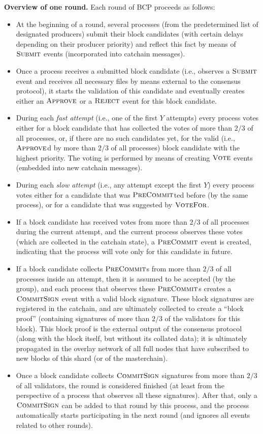 \documentclass[12pt,oneside]{article}
\def\makepoint#1{\medbreak\noindent{\bf #1.\ }}
\def\nxsubpoint{\refstepcounter{subsubsection}%
  \smallbreak\makepoint{\thesubsubsection}}
\def\emb#1{\textbf{#1.}}
\def\opsc#1{\operatorname{\textsc{#1}}}
\def\Submit{\opsc{Submit}}
\def\Approve{\opsc{Approve}}
\def\Reject{\opsc{Reject}}
\def\PreCommit{\opsc{PreCommit}}
\def\CommitSign{\opsc{CommitSign}}
\def\Vote{\opsc{Vote}}
\def\VoteFor{\opsc{VoteFor}}
\begin{document}
\nxsubpoint\emb{Overview of one round}
Each round of BCP proceeds as follows:
\begin{itemize}
\item At the beginning of a round, several processes (from the predetermined list of designated producers) submit their block candidates (with certain delays depending on their producer priority) and reflect this fact by means of $\Submit$ events (incorporated into catchain messages).
\item Once a process receives a submitted block candidate (i.e., observes a $\Submit$ event and receives all necessary files by means external to the consensus protocol), it starts the validation of this candidate and eventually creates either an $\Approve$ or a $\Reject$ event for this block candidate.
\item During each {\em fast attempt\/} (i.e., one of the first $Y$ attempts) every process votes either for a block candidate that has collected the votes of more than $2/3$ of all processes, or, if there are no such candidates yet, for the valid (i.e., $\Approve$d by more than $2/3$ of all processes) block candidate with the highest priority. The voting is performed by means of creating $\Vote$ events (embedded into new catchain messages).
\item During each {\em slow attempt\/} (i.e., any attempt except the first $Y$) every process votes either for a candidate that was $\PreCommit$ted before (by the same process), or for a candidate that was suggested by $\VoteFor$.
\item If a block candidate has received votes from more than $2/3$ of all processes during the current attempt, and the current process observes these votes (which are collected in the catchain state), a $\PreCommit$ event is created, indicating that the process will vote only for this candidate in future.
\item If a block candidate collects $\PreCommit$s from more than $2/3$ of all processes inside an attempt, then it is assumed to be accepted (by the group), and each process that observes these $\PreCommit$s creates a $\CommitSign$ event with a valid block signature. These block signatures are registered in the catchain, and are ultimately collected to create a ``block proof'' (containing signatures of more than $2/3$ of the validators for this block). This block proof is the external output of the consensus protocol (along with the block itself, but without its collated data); it is ultimately propagated in the overlay network of all full nodes that have subscribed to new blocks of this shard (or of the masterchain).
\item Once a block candidate collects $\CommitSign$ signatures from more than $2/3$ of all validators, the round is considered finished (at least from the perspective of a process that observes all these signatures). After that, only a $\CommitSign$ can be added to that round by this process, and the process automatically starts participating in the next round (and ignores all events related to other rounds).
\end{itemize}
\end{document}
